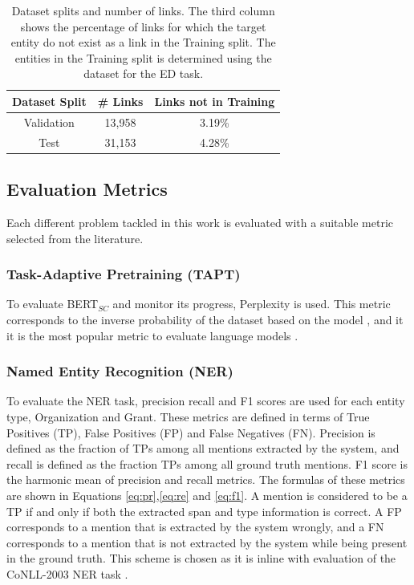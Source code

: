 \documentclass{report}
\theoremstyle{definition}
\theoremstyle{remark}
\begin{document}
\begin{table}[H]
    \centering
    \begin{tabular}{ccc}
    Dataset Split & \# Links & Links not in Training\\
    \hline
    Validation &  13,958 & 3.19\% \\
    Test &            31,153 & 4.28\% \\
    \end{tabular}
    \caption{Dataset splits and number of links. The third column shows the percentage of links for which the target entity do not exist as a link in the Training split. The entities in the Training split is determined using the dataset for the ED task.}
    \label{tab:goldstatsel3}
\end{table}

\subsection{Evaluation Metrics}
\label{sec:EvalExpSetupEval}
Each different problem tackled in this work is evaluated with a suitable metric selected from the literature.
\subsubsection{Task-Adaptive Pretraining (TAPT)}
To evaluate BERT$_{SC}$ and monitor its progress, Perplexity is used. This metric corresponds to the inverse probability of the dataset based on the model \cite{perplexity}, and it it is the most popular metric to evaluate language models \cite{perplexity}. 
\subsubsection{Named Entity Recognition (NER)}
To evaluate the NER task, precision recall and F1 scores are used for each entity type, Organization and Grant. These metrics are defined in terms of True Positives (TP), False Positives (FP) and False Negatives (FN). Precision is defined as the fraction of TPs among all mentions extracted by the system, and recall is defined as the fraction TPs among all ground truth mentions. F1 score is the harmonic mean of precision and recall metrics. The formulas of these metrics are shown in Equations \ref{eq:pr},\ref{eq:re} and \ref{eq:f1}. A mention is considered to be a TP if and only if both the extracted span and type information is correct. A FP corresponds to a mention that is extracted by the system wrongly, and a FN corresponds to a mention that is not extracted by the system while being present in the ground truth. This scheme is chosen as it is inline with evaluation of the CoNLL-2003 NER task \cite{conll}.
\end{document}
